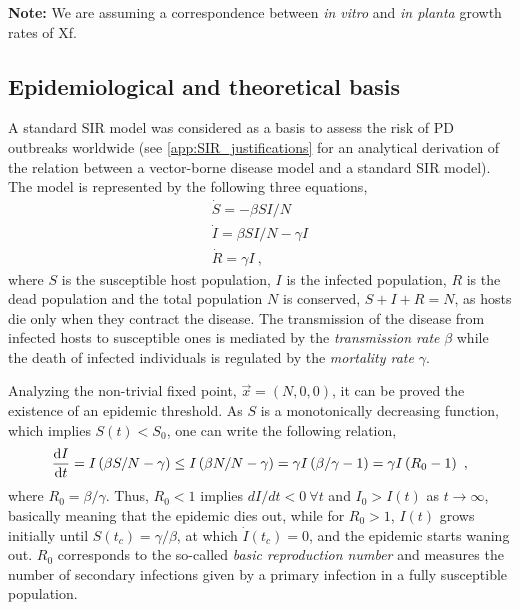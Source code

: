 \textbf{Note:} We are assuming a correspondence between \textit{in vitro}
and \textit{in planta} growth rates of Xf.

\subsection{Epidemiological and theoretical basis}\label{app:SIR}

A standard SIR model was considered as a basis to assess the risk of PD
outbreaks worldwide (see \cref{app:SIR_justifications} for an analytical
derivation of the relation between a vector-borne disease model and a standard
SIR model). The model is represented by the following three equations,
\begin{equation}
    \begin{array}{l}
        \dot{S}=-\beta SI/N           \\
        \dot{I}=\beta SI/N - \gamma I \\
        \dot{R}=\gamma I \ ,
    \end{array}
    \label{eq:SIRmodel}
\end{equation}
where $S$ is the susceptible host population, $I$ is the infected
population, $R$ is the dead population and the total population $N$ is
conserved, $S+I+R=N$, as hosts die only when they contract the disease.
The transmission of the disease from infected hosts to susceptible ones is
mediated by the \textit{transmission rate} $\beta$ while the death of infected
individuals is regulated by the \textit{mortality rate} $\gamma$.

Analyzing the non-trivial fixed point, $\vec{x}=(N, 0, 0)$, it can be
proved the existence of an epidemic threshold. As $S$ is a monotonically
decreasing function, which implies $S(t)<S_0$, one can write the following
relation,
\begin{equation}\label{eq: threshold_t}
    \frac{\mathrm{d} I}{\mathrm{d} t}=I\left(\beta S/N-\gamma\right)\leq I\left(\beta
        N/N-\gamma\right)=\gamma I\left(\beta/\gamma-1\right)=\gamma
    I\left(R_0-1\right) \ ,
\end{equation}
where $R_0= \beta/\gamma$. Thus, $R_0<1$ implies $dI/dt<0 \ \forall t$ and
$I_0>I(t)$ as $t\to\infty$, basically meaning that the epidemic dies out, while
for $R_0>1$, $I(t)$ grows initially until $S(t_c)=\gamma/\beta$, at which
$\dot{I}(t_c)=0$, and the epidemic starts waning out.
$R_0$ corresponds to the so-called \textit{basic reproduction number} and
measures the number of secondary infections given by a primary infection in a
fully susceptible population.

